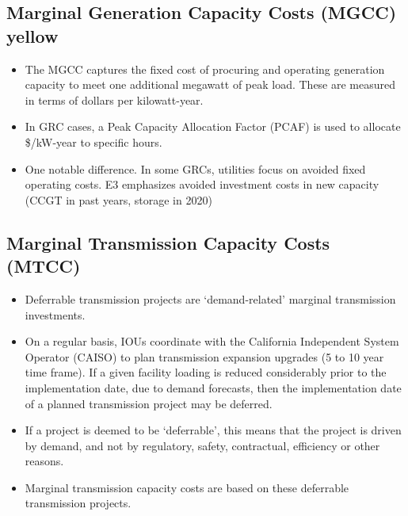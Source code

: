 \documentclass[11pt]{article}
\begin{document}
\begin{itemize}



\subsection{Marginal Generation Capacity Costs (MGCC) yellow}

\begin{itemize}

\item The MGCC captures the fixed cost of procuring and operating generation capacity to meet one additional megawatt of peak load. These are measured in terms of  dollars per kilowatt-year. 

\item In GRC cases, a Peak Capacity Allocation Factor (PCAF) is used to allocate \$/kW-year to specific hours.

\item One notable difference. In some GRCs, utilities focus on avoided fixed operating costs. E3 emphasizes avoided investment costs in new capacity (CCGT in past years, storage in 2020)


\end{itemize}



\subsection{Marginal Transmission Capacity Costs (MTCC) }

\begin{itemize}

\item Deferrable transmission projects are `demand-related' marginal  transmission investments.

\item On a regular basis, IOUs coordinate with the California Independent System Operator (CAISO) to plan transmission expansion upgrades (5 to 10 year time frame). If a given facility loading is reduced considerably prior to the implementation date, due to demand forecasts, then the implementation date of a planned transmission project may be deferred. 

\item If a project is deemed to be `deferrable', this means that the  project is driven by demand, and not by regulatory, safety, contractual, efficiency or other reasons. 

\item Marginal transmission capacity costs are based on these deferrable transmission projects.


\end{itemize}
\end{itemize}
\end{document}
